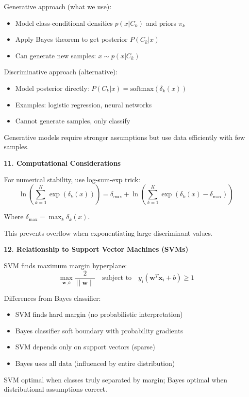 \documentclass[12pt]{article}
\begin{document}
\begin{explanation}
Generative approach (what we use):
\begin{itemize}
\item Model class-conditional densities $p(x|C_k)$ and priors $\pi_k$
\item Apply Bayes theorem to get posterior $P(C_k|x)$
\item Can generate new samples: $x \sim p(x|C_k)$
\end{itemize}

Discriminative approach (alternative):
\begin{itemize}
\item Model posterior directly: $P(C_k|x) = \text{softmax}(\delta_k(x))$
\item Examples: logistic regression, neural networks
\item Cannot generate samples, only classify
\end{itemize}

Generative models require stronger assumptions but use data efficiently with few samples.

\textbf{11. Computational Considerations}

For numerical stability, use log-sum-exp trick:
\[\ln\left(\sum_{k=1}^K \exp(\delta_k(x))\right) = \delta_{\max} + \ln\left(\sum_{k=1}^K \exp(\delta_k(x) - \delta_{\max})\right)\]

Where $\delta_{\max} = \max_k \delta_k(x)$.

This prevents overflow when exponentiating large discriminant values.

\textbf{12. Relationship to Support Vector Machines (SVMs)}

SVM finds maximum margin hyperplane:
\[\max_{\mathbf{w}, b} \frac{2}{\|\mathbf{w}\|} \quad \text{subject to} \quad y_i(\mathbf{w}^T\mathbf{x}_i + b) \geq 1\]

Differences from Bayes classifier:
\begin{itemize}
\item SVM finds hard margin (no probabilistic interpretation)
\item Bayes classifier soft boundary with probability gradients
\item SVM depends only on support vectors (sparse)
\item Bayes uses all data (influenced by entire distribution)
\end{itemize}

SVM optimal when classes truly separated by margin; Bayes optimal when distributional assumptions correct.

\end{explanation}
\end{document}
